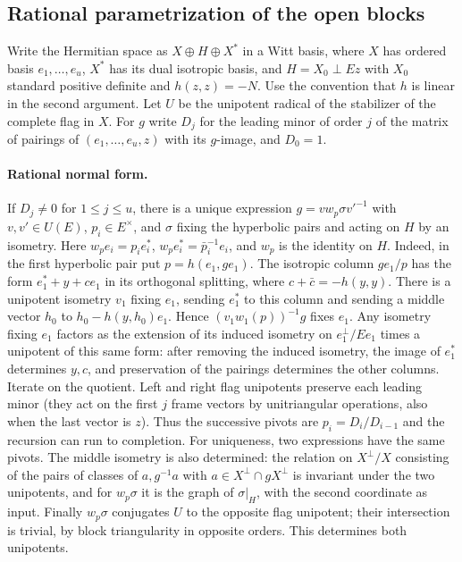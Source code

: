 \subsection{Rational parametrization of the open blocks}\label{moment:open}

Write the Hermitian space as $X\oplus H\oplus X^*$ in a Witt basis,
where $X$ has ordered basis $e_1,\ldots,e_u$, $X^*$ has its dual
isotropic basis, and $H=X_0\perp Ez$ with $X_0$ standard positive
definite and $h(z,z)=-N$. Use the convention that $h$ is linear in the
second argument. Let $U$ be the unipotent radical of the stabilizer of
the complete flag in $X$. For $g$ write $D_j$ for the leading minor
of order $j$ of the matrix of pairings of $(e_1,\ldots,e_u,z)$
with its $g$-image, and $D_0=1$.

\paragraph{Rational normal form.}
If $D_j\ne0$ for $1\le j\le u$, there is a unique expression
$g=v w_p\sigma v'^{-1}$ with $v,v'\in U(E)$, $p_i\in E^\times$,
and $\sigma$ fixing the hyperbolic pairs and acting on $H$ by an
isometry. Here $w_p e_i=p_i e_i^*$, $w_p e_i^*=\bar p_i^{-1}e_i$,
and $w_p$ is the identity on $H$. Indeed, in the first hyperbolic
pair put $p=h(e_1,g e_1)$. The isotropic column $g e_1/p$ has the
form $e_1^*+y+c e_1$ in its orthogonal splitting, where
$c+\bar c=-h(y,y)$. There is a unipotent isometry $v_1$ fixing
$e_1$, sending $e_1^*$ to this column and sending a middle vector
$h_0$ to $h_0-h(y,h_0)e_1$. Hence $(v_1 w_1(p))^{-1}g$ fixes $e_1$.
Any isometry fixing $e_1$ factors as the extension of its induced
isometry on $e_1^\perp/E e_1$ times a unipotent of this same form:
after removing the induced isometry, the image of $e_1^*$ determines
$y,c$, and preservation of the pairings determines the other columns.
Iterate on the quotient. Left and right flag unipotents preserve each
leading minor (they act on the first $j$ frame vectors by
unitriangular operations, also when the last vector is $z$). Thus the
successive pivots are $p_i=D_i/D_{i-1}$ and the recursion can run to
completion. For uniqueness, two expressions have the same pivots.
The middle isometry is also determined: the relation on $X^\perp/X$
consisting of the pairs of classes of $a,g^{-1}a$ with
$a\in X^\perp\cap g X^\perp$ is invariant under the two unipotents,
and for $w_p\sigma$ it is the graph of $\sigma|_H$, with the second
coordinate as input. Finally $w_p\sigma$ conjugates $U$ to the
opposite flag unipotent; their intersection is trivial, by block
triangularity in opposite orders. This determines both unipotents.

